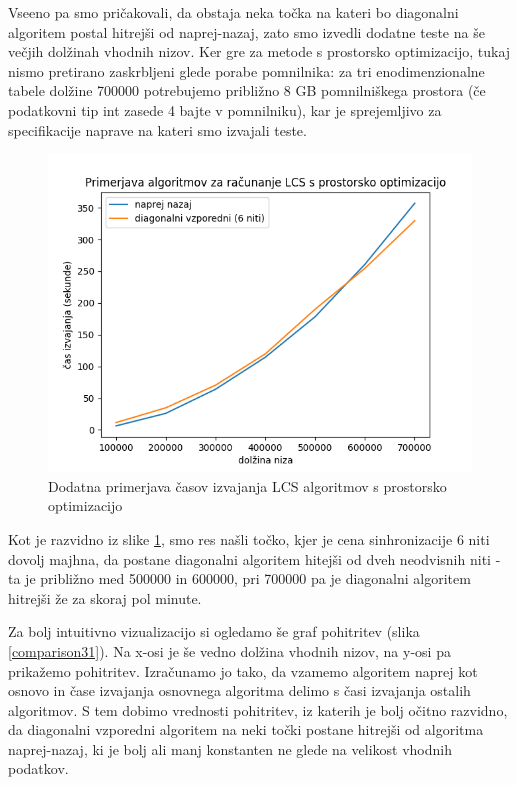 \documentclass[a4paper,12pt,openright]{book}
\begin{document}
Vseeno pa smo pričakovali, da obstaja neka točka na kateri bo diagonalni algoritem postal hitrejši od naprej-nazaj, zato smo izvedli dodatne teste na še večjih dolžinah vhodnih nizov. Ker gre za metode s prostorsko optimizacijo, tukaj nismo pretirano zaskrbljeni glede porabe pomnilnika: za tri enodimenzionalne tabele dolžine 700000 potrebujemo približno 8 GB pomnilniškega prostora (če podatkovni tip int zasede 4 bajte v pomnilniku), kar je sprejemljivo za specifikacije naprave na kateri smo izvajali teste. 

\begin{figure}[htb]
\centering
\includegraphics[width=1.0\textwidth]{plots/LCSextended.png}
\caption{Dodatna primerjava časov izvajanja LCS algoritmov s prostorsko optimizacijo}
\label{comparison3}
\end{figure}

Kot je razvidno iz slike \ref{comparison3}, smo res našli točko, kjer je cena sinhronizacije 6 niti dovolj majhna, da postane diagonalni algoritem hitejši od dveh neodvisnih niti - ta je približno med 500000 in 600000, pri 700000 pa je diagonalni algoritem hitrejši že za skoraj pol minute. 

Za bolj intuitivno vizualizacijo si ogledamo še graf pohitritev (slika \ref{comparison31}). Na x-osi je še vedno dolžina vhodnih nizov, na y-osi pa prikažemo pohitritev. Izračunamo jo tako, da vzamemo algoritem naprej kot osnovo in čase izvajanja osnovnega algoritma delimo s časi izvajanja ostalih algoritmov. S tem dobimo vrednosti pohitritev, iz katerih je bolj očitno razvidno, da diagonalni vzporedni algoritem na neki točki postane hitrejši od algoritma naprej-nazaj, ki je bolj ali manj konstanten ne glede na velikost vhodnih podatkov. 
\end{document}
